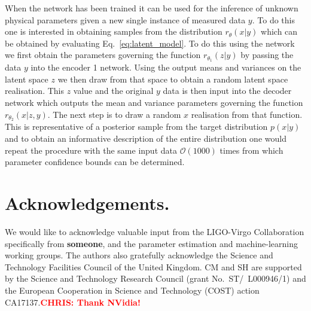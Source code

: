 \documentclass[%
showpacs,
 amsmath,amssymb,
 aps,
 twocolumn,
 prl,
 reprint,
floatfix,
]{revtex4-1}
\newcommand{\chris}[1]{\textbf{\textcolor{red}{CHRIS: #1}}}
\begin{document}
When the network has been trained it can be used for the inference of unknown
physical parameters given a new single instance of measured data $y$. To do
this one is interested in obtaining samples from the distribution
$r_{\theta}(x|y)$ which can be obtained by evaluating
Eq.~\ref{eq:latent_model}. To do this using the network we first obtain the
parameters governing the function $r_{\theta_{1}}(z|y)$ by passing the data $y$
into the encoder 1 network. Using the output means and variances on the latent space
$z$ we then draw from that space to obtain a random latent space realisation.
This $z$ value and the original $y$ data is then input into the decoder network
which outputs the mean and variance parameters governing the function
$r_{\theta_{2}}(x|z,y)$. The next step is to draw a random $x$ realisation from
that function. This is representative of a posterior sample from the target
distribution $p(x|y)$ and to obtain an informative description of the entire
distribution one would repeat the procedure with the same input data
$\mathcal{O}(1000)$ times from which parameter confidence bounds can be
determined.      


%
%
\section{Acknowledgements.}
%
We would like to acknowledge valuable input from the LIGO-Virgo Collaboration
specifically from {\textbf{someone}}, and the parameter estimation and
machine-learning working groups. The authors also gratefully acknowledge the
Science and Technology Facilities Council of the United Kingdom. CM and SH are
supported by the Science and Technology Research Council (grant
No.~ST/~L000946/1) and the European Cooperation in Science and Technology
(COST) action CA17137.\chris{Thank NVidia!}




\end{document}
